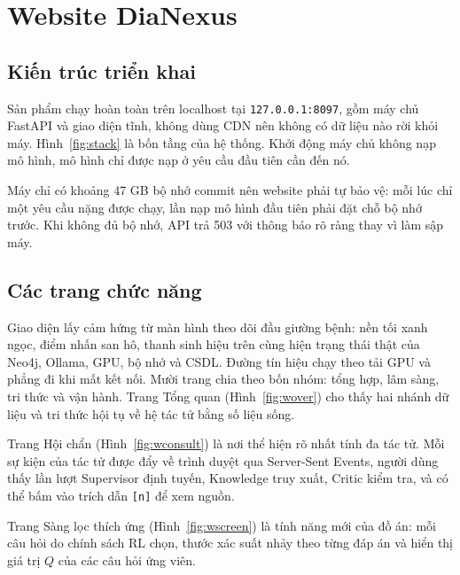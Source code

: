 \chapter{Website DiaNexus}\label{chap:web}

\section{Kiến trúc triển khai}

Sản phẩm chạy hoàn toàn trên localhost tại \texttt{127.0.0.1:8097}, gồm máy chủ FastAPI và giao diện tĩnh, không dùng CDN nên không có dữ liệu nào rời khỏi máy. Hình~\ref{fig:stack} là bốn tầng của hệ thống. Khởi động máy chủ không nạp mô hình, mô hình chỉ được nạp ở yêu cầu đầu tiên cần đến nó.


Máy chỉ có khoảng 47 GB bộ nhớ commit nên website phải tự bảo vệ: mỗi lúc chỉ một yêu cầu nặng được chạy, lần nạp mô hình đầu tiên phải đặt chỗ bộ nhớ trước. Khi không đủ bộ nhớ, API trả 503 với thông báo rõ ràng thay vì làm sập máy.


\section{Các trang chức năng}

Giao diện lấy cảm hứng từ màn hình theo dõi đầu giường bệnh: nền tối xanh ngọc, điểm nhấn san hô, thanh sinh hiệu trên cùng hiện trạng thái thật của Neo4j, Ollama, GPU, bộ nhớ và CSDL. Đường tín hiệu chạy theo tải GPU và phẳng đi khi mất kết nối. Mười trang chia theo bốn nhóm: tổng hợp, lâm sàng, tri thức và vận hành. Trang Tổng quan (Hình~\ref{fig:wover}) cho thấy hai nhánh dữ liệu và tri thức hội tụ về hệ tác tử bằng số liệu sống.


Trang Hội chẩn (Hình~\ref{fig:wconsult}) là nơi thể hiện rõ nhất tính đa tác tử. Mỗi sự kiện của tác tử được đẩy về trình duyệt qua Server-Sent Events, người dùng thấy lần lượt Supervisor định tuyến, Knowledge truy xuất, Critic kiểm tra, và có thể bấm vào trích dẫn \texttt{[n]} để xem nguồn.


Trang Sàng lọc thích ứng (Hình~\ref{fig:wscreen}) là tính năng mới của đồ án: mỗi câu hỏi do chính sách RL chọn, thước xác suất nhảy theo từng đáp án và hiển thị giá trị $Q$ của các câu hỏi ứng viên.


